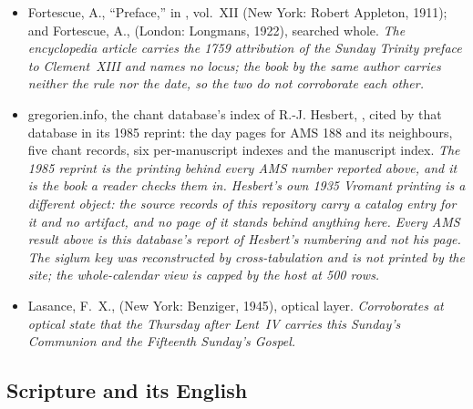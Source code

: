 \begin{itemize}[leftmargin=1.2em, itemsep=0.15em]
{volume's own extracted text layer, with no page image behind them. A
nineteenth-century liturgist writing devotionally, cited as that; a search of the
whole chapter for the vocabulary of liturgical history returns nothing.}%
\fi
\item Fortescue, A., ``Preface,'' in , vol.~XII
(New York: Robert Appleton, 1911); and Fortescue, A.,  (London: Longmans, 1922), searched whole. \textit{The
encyclopedia article carries the 1759 attribution of the Sunday Trinity preface
to Clement~XIII and names no  locus; the book by the same author
carries neither the rule nor the date, so the two do not corroborate each other.}
\item gregorien.info, the chant database's index of R.-J. Hesbert,
, cited by that database in its 1985
reprint: the day pages for AMS 188 and its neighbours, five chant records, six
per-manuscript indexes and the manuscript index. \textit{The 1985 reprint is
the printing behind every AMS number reported above, and it is the book a
reader checks them in. Hesbert's own 1935 Vromant printing is a different
object: the source records of this repository carry a catalog entry for it and
no artifact, and no page of it stands behind anything here. Every AMS result
above is this database's report of Hesbert's numbering and not his page. The
siglum key was reconstructed by cross-tabulation and is not printed by the
site; the whole-calendar view is capped by the host at 500 rows.}
\ifdefined\TriptychSynthesisEdition\else
\item Lasance, F.~X.,  (New York: Benziger, 1945),
optical layer. \textit{Corroborates at optical state that the Thursday after
Lent~IV carries this Sunday's Communion and the Fifteenth Sunday's Gospel.}
\fi
\end{itemize}

\subsection*{Scripture and its English}

